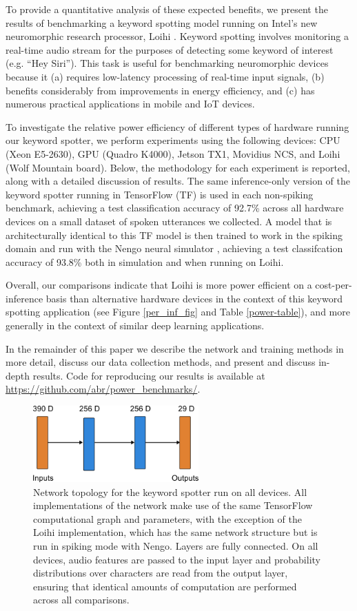 \documentclass[sigconf, screen]{acmart}
\begin{document}
To provide a quantitative analysis of these expected benefits, we present the results of benchmarking a keyword spotting model running on Intel's new neuromorphic research processor, Loihi \cite{Davies:2018}. Keyword spotting involves monitoring a real-time audio stream for the purposes of detecting some keyword of interest (e.g. ``Hey Siri''). This task is useful for benchmarking neuromorphic devices because it (a) requires low-latency processing of real-time input signals, (b) benefits considerably from improvements in energy efficiency, and (c) has numerous practical applications in mobile and IoT devices.

To investigate the relative power efficiency of different types of hardware running our keyword spotter, we perform experiments using the following devices: CPU (Xeon E5-2630), GPU (Quadro K4000), Jetson TX1, Movidius NCS, and Loihi (Wolf Mountain board). Below, the methodology for each experiment is reported, along with a detailed discussion of results. The same inference-only version of the keyword spotter running in TensorFlow (TF) is used in each non-spiking benchmark, achieving a test classification accuracy of 92.7\% across all hardware devices on a small dataset of spoken utterances we collected. A model that is architecturally identical to this TF model is then trained to work in the spiking domain \cite{Hunsberger:2016} and run with the Nengo neural simulator \cite{Bekolay:2014}, achieving a test classifcation accuracy of 93.8\% both in simulation and when running on Loihi.


Overall, our comparisons indicate that Loihi is more power efficient on a cost-per-inference basis than alternative hardware devices in the context of this keyword spotting application (see Figure \ref{per_inf_fig} and Table \ref{power-table}), and more generally in the context of similar deep learning applications.

In the remainder of this paper we describe the network and training methods in more detail, discuss our data collection methods, and present and discuss in-depth results. Code for reproducing our results is available at \url{https://github.com/abr/power\_benchmarks/}.

\begin{figure}[!ht]
\centering
    \includegraphics[width=2.5in]{./figures/network.png}
    \caption{Network topology for the keyword spotter run on all devices. All implementations of the network make use of the same TensorFlow computational graph and parameters, with the exception of the Loihi implementation, which has the same network structure but is run in spiking mode with Nengo. Layers are fully connected. On all devices, audio features are passed to the input layer and probability distributions over characters are read from the output layer, ensuring that identical amounts of computation are performed across all comparisons.}
\label{network_fig}
\end{figure}
\end{document}

